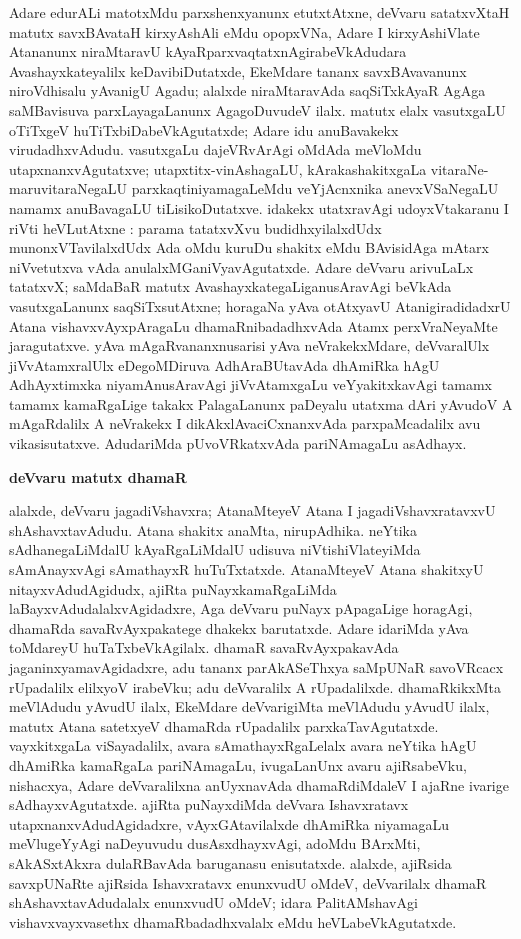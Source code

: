 Adare edurALi matotxMdu parxshenxyanunx etutxtAtxne, deVvaru satatxvXtaH matutx savxBA\-vataH kirxyAshAli eMdu opopxVNa, Adare I kirxyAshiVlate Atananunx niraMta\-ravU kAyaR\-parxvaqtatxnAgirabeVkAdudara Avashayxkateyalilx keDavibiDutatxde, EkeMdare tananx savxBAva\-vanunx niroVdhisalu yAvanigU Agadu; alalxde niraMtaravAda saqSiTxkAyaR AgAga saMBavisuva parxLayagaLanunx AgagoDuvudeV ilalx. matutx elalx vasutxgaLU oTiTxgeV huTiTx\-biDabeVkAgutatxde; Adare idu anuBavakekx virudadhxvAdudu. vasutxgaLu dajeVRvArAgi oMdAda meVloMdu utapxnanxvAgutatxve; utapxtitx-vinAshagaLU, kArakashakitxgaLa vitaraNe-\-maruvitaraNegaLU parxkaqtiniyamagaLeMdu veYjAcnxnika anevxVSaNegaLU namamx anuBava\-gaLU tiLisikoDutatxve. idakekx utatxravAgi udoyxVtakaranu I riVti heVLutAtxne : parama tatatxvXvu budidhxyilalxdUdx munonxVTavilalxdUdx Ada oMdu kuruDu shakitx eMdu BAvisi\-dAga mAtarx niVvetutxva vAda anulalxMGaniVyavAgutatxde. Adare deVvaru arivuLaLx tatatxvX; saMdaBaR matutx AvashayxkategaLiganusAravAgi beVkAda vasutx\-gaLanunx saqSiTxsutAtxne; hora\-gaNa yAva otAtxyavU AtanigiradidadxrU Atana vishavx\-vAyxpAragaLu dhamaRnibadadhx\-vAda Atamx perxVraNeyaMte jaragutatxve. yAva mAgaRvananxnusarisi yAva neVra\-kekxMdare, deVva\-ralUlx jiVvAtamxralUlx eDegoMDiruva AdhAraBUtavAda dhAmiRka hAgU AdhAyxtimxka niyamAnusAravAgi jiVvAtamxgaLu veYyakitxkavAgi tamamx tamamx kamaRgaLige takakx Pala\-gaLanunx paDeyalu utatxma dAri yAvudoV A mAgaRdalilx A neVrakekx I dikAkxlAva\-ciCxnanxvAda parxpaMcadalilx avu vikasisutatxve. AdudariMda pUvoVRkatxvAda pariNAma\-gaLu asAdhayx.

\smallskip
\begin{center}
{\Large\bf deVvaru matutx dhamaR}
\end{center}

alalxde, deVvaru jagadiVshavxra; AtanaMteyeV Atana I jagadiVshavxratavxvU shAshavxta\-vAdudu. Atana shakitx anaMta, nirupAdhika. neYtika sAdhanegaLiMdalU kAyaRgaLiMdalU udisuva niVtishiVlateyiMda sAmAnayxvAgi sAmathayxR huTuTxtatxde. AtanaMteyeV Atana shakitxyU nitayxvAdudAgidudx, ajiRta puNayxkamaRgaLiMda laBayxvAdudalalxvAgidadxre, Aga deVvaru puNayx pApagaLige horagAgi, dhamaRda savaRvAyxpakatege dhakekx barutatxde. Adare idariMda yAva toMdareyU huTaTxbeVkAgilalx. dhamaR savaRvAyxpakavAda jaganinxyamavAgidadxre, adu tananx parAkASeThxya saMpUNaR savoVRcacx rUpadalilx elilxyoV irabeVku; adu deVvaralilx A rUpadalilxde. dhamaRkikxMta meVlAdudu yAvudU ilalx, EkeMdare deVvarigiMta meVlAdudu yAvudU ilalx, matutx Atana satetxyeV dhamaRda rUpadalilx parxkaTavAgutatxde. vayxkitxgaLa viSayadalilx, avara sAmathayxRgaLelalx avara neYtika hAgU dhAmiRka kamaRgaLa pariNAmagaLu, ivugaLanUnx avaru ajiRsabeVku, nishacxya, Adare deVvaralilxna anUyxnavAda dhamaRdiMdaleV I ajaRne ivarige sAdhayxvAgutatxde. ajiRta puNayxdiMda deVvara Ishavxratavx utapxnanxvAdudAgidadxre, vAyxGAtavilalxde dhAmiRka niyamagaLu meVlugeYyAgi naDeyuvudu dusAsxdhayxvAgi, adoMdu BArxMti, sAkASxtAkxra dulaRBavAda baruganasu enisutatxde. alalxde, ajiRsida savxpUNaRte ajiRsida Ishavxratavx enunxvudU oMdeV, deVvarilalx dhamaR shAshavxtavAdudalalx enunxvudU oMdeV; idara PalitAMshavAgi vishavxvayxvasethx dhamaRbadadhxvalalx eMdu heVLabeVkAgutatxde.

